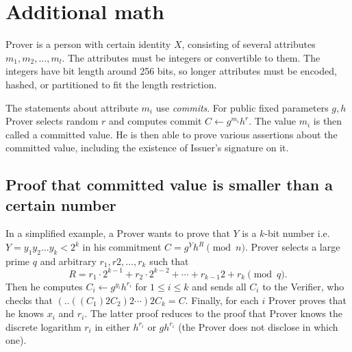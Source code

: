 \documentclass[a4paper]{article}
\begin{document}
\appendix 

\section{Additional math}\label{sec:detail}

 Prover  is a person with certain identity $X$, consisting of several attributes $m_1,m_2,\ldots, m_l$. The attributes must be integers or convertible to them. The integers have bit length around 256 bits, so longer attributes must be encoded, hashed, or partitioned to fit the length restriction.
 
 The statements about attribute $m_i$ use \emph{commits}. For public fixed parameters $g,h$
 Prover selects random $r$ and computes commit $C\leftarrow  g^{m_i}h^r$. The value $m_i$ is then called a committed value. He is then able to prove various assertions about the committed value, including the existence of Issuer's signature on it.
 
  
\subsection{Proof that committed value is smaller than a certain number} In a simplified example, a Prover wants to prove that $Y$ is a $k$-bit number i.e. $Y = y_1y_2\ldots y_k<2^k$ in his commitment $C = g^Y h^R \pmod{n}$. Prover selects a large prime $q$ and arbitrary $r_1,r2,\ldots,r_k$ such that  
$$
R = r_1\cdot 2^{k-1}+r_2\cdot 2^{k-2}+\cdots+r_{k-1}2+r_k \pmod{ q}.
$$
 Then he computes $C_i \leftarrow g^{y_i}h^{r_i}$ for $1\leq i \leq k$ and sends all $C_i$ to the Verifier, who checks that 
 $(..((C_1)2 C_2)2\cdots)2C_k = C$. Finally, for each $i$ Prover proves that he knows $x_i$ and $r_i$. The latter proof reduces to the proof that Prover knows the discrete logarithm $r_i$ in either $h^{r_i}$  or $gh^{r_i}$ (the Prover does not disclose in which one). 
 
 
\end{document}
